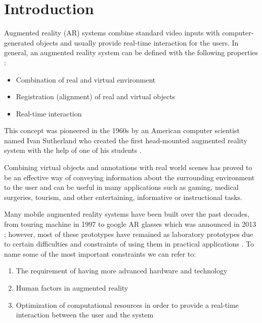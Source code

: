\documentclass[dvips,letterpaper,12pt]{report}
\begin{document}
\chapter{Introduction}

Augmented reality (AR) systems combine standard video inputs with computer-generated objects and
usually provide real-time interaction for the users. 
In general, an augmented reality system can be defined with the following properties \cite{azuma01} :
\begin{itemize}
\item Combination of real and virtual environment
\item Registration (alignment) of real and virtual objects
\item Real-time interaction
\end{itemize}
This concept was pioneered in the 1960s by an American computer scientist named Ivan Sutherland
who created the first head-mounted augmented reality
system with the help of one of his students \cite{azuma01}.

Combining virtual objects and annotations with real
world scenes has proved to be an effective way of conveying information about the surrounding environment to
the user and can be useful in many applications such as gaming, medical surgeries, tourism, and other entertaining, informative or instructional tasks.

Many mobile augmented reality systems have been built over the past decades, from touring machine in 1997 \cite{fei97} 
to google AR glasses which was announced in 2013 \cite{google}; however, most of these prototypes have remained as laboratory prototypes
due to certain difficulties and constraints of using them in practical applications \cite{dras96,liv05}. To name some of the most important constraints
we can refer to:
\begin{enumerate}
\item The requirement of having more advanced hardware and technology
\item Human factors in augmented reality 
\item Optimization of computational resources in order to provide a real-time interaction between the user and the system
\end{enumerate}
\end{document}

